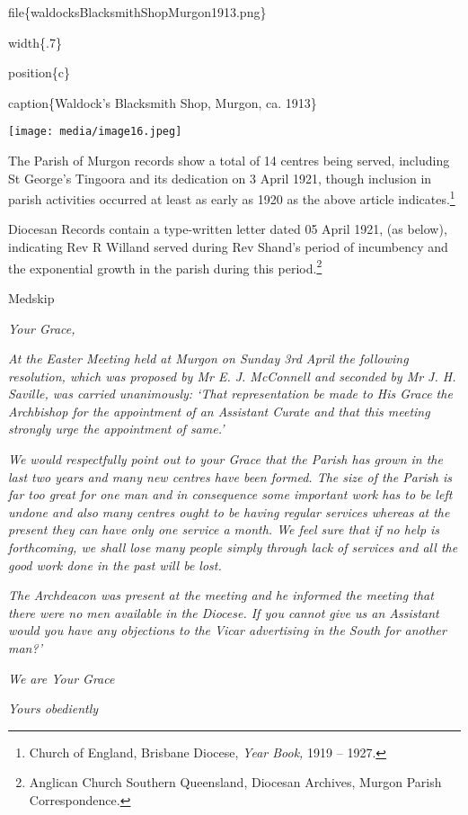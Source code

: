 file\{waldocksBlacksmithShopMurgon1913.png\}

width\{.7\}

position\{c\}

caption\{Waldock's Blacksmith Shop, Murgon, ca. 1913\}

\texttt{[image: media/image16.jpeg]}

The Parish of Murgon records show a total of 14 centres being served, including St George's Tingoora and its dedication on 3 April 1921, though inclusion in parish activities occurred at least as early as 1920 as the above article indicates.\footnote{Church of England, Brisbane Diocese, \emph{Year Book,} 1919 -- 1927.}

Diocesan Records contain a type-written letter dated 05 April 1921, (as below), indicating Rev R Willand served during Rev Shand's period of incumbency and the exponential growth in the parish during this period.\footnote{Anglican Church Southern Queensland, Diocesan Archives, Murgon Parish Correspondence.}

Medskip

\emph{Your Grace,}

\emph{At the Easter Meeting held at Murgon on Sunday 3rd April the following resolution, which was proposed by Mr E. J. McConnell and seconded by Mr J. H. Saville, was carried unanimously: `That representation be made to His Grace the Archbishop for the appointment of an Assistant Curate and that this meeting strongly urge the appointment of same.'}

\emph{We would respectfully point out to your Grace that the Parish has grown in the last two years and many new centres have been formed. The size of the Parish is far too great for one man and in consequence some important work has to be left undone and also many centres ought to be having regular services whereas at the present they can have only one service a month. We feel sure that if no help is forthcoming, we shall lose many people simply through lack of services and all the good work done in the past will be lost.}

\emph{The Archdeacon was present at the meeting and he informed the meeting that there were no men available in the Diocese. If you cannot give us an Assistant would you have any objections to the Vicar advertising in the South for another man?'}

\emph{We are Your Grace}

\emph{Yours obediently}

